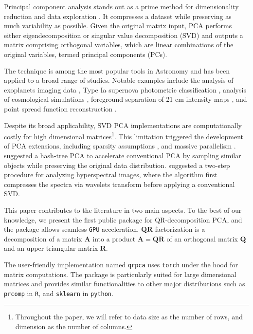 \documentclass[preprint,authoryear,11pt,5p,times]{elsarticle}
\begin{document}
Principal component analysis \citep[PCA;][]{Pearson1901} stands out as a prime method for dimensionality reduction and data exploration \citep[see][for a review]{Jollife2016}. It compresses a dataset while preserving as much variability as possible. Given the original matrix input, PCA performs either eigendecomposition or singular value decomposition (SVD) and outputs a matrix comprising orthogonal variables, which are linear combinations of the original variables,  termed principal components (PCs). 

The technique is among the most popular tools in Astronomy and has been applied to a broad range of studies. Notable examples include the analysis of exoplanets imaging data \citep{Amara2012,Kiefer2021}, Type Ia supernova photometric classification \citep{Ishida2013},  analysis of cosmological simulations \citep{DeSouza2014},  foreground separation of 21 cm intensity maps  \citep{Yohana2021}, and point spread function reconstruction \citep{Nie2021}.

 

Despite its broad applicability, SVD PCA  implementations are computationally costly for high dimensional matrices\footnote{Throughout the paper, we will refer to data size as the number of rows, and dimension as the number of columns.}. This limitation triggered the development of PCA extensions, including sparsity assumptions \citep[e.g.][]{Fan2018,ADNAN2021101710}, and massive parallelism \citep{LAZCANO2017101}. \citet{HashTreePC} suggested a hash-tree PCA to accelerate conventional PCA by sampling similar objects while preserving the original data distribution. \citet{VOGT20011} suggested a two-step procedure for analyzing hyperspectral images, where the algorithm first compresses the spectra via wavelets transform before applying a conventional SVD. 

This paper contributes to the literature in two main aspects. To the best of our knowledge, we present the first public package for  QR-decomposition PCA, and the package allows seamless {\tt GPU} acceleration. $\mathbf{QR}$ factorization is a decomposition of a matrix $\mathbf{A}$ into a product $\mathbf{A} = \mathbf{QR}$ of an orthogonal matrix $\mathbf{Q}$ and an upper triangular matrix $\mathbf{R}$.

The user-friendly implementation named  \texttt{qrpca} uses \texttt{torch} \citep{RN7,rtorch} under the hood for matrix computations. The package is particularly suited for large dimensional matrices and provides similar functionalities to other major distributions such as \texttt{prcomp} in \texttt{R}, and \texttt{sklearn} in \texttt{python}. 
\end{document}
